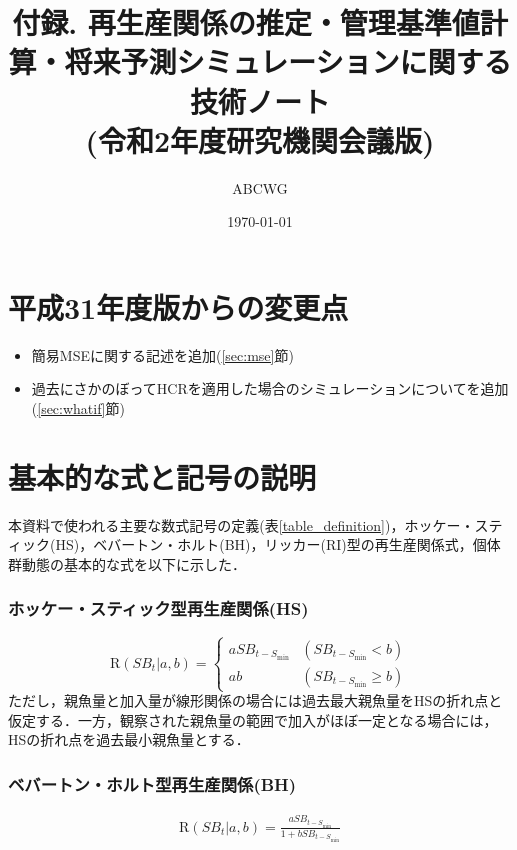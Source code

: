 \documentclass[11pt]{jsarticle}
\begin{document}
\title{付録. 再生産関係の推定・管理基準値計算・将来予測シミュレーションに関する技術ノート \\
  \Large (令和2年度研究機関会議版)
}
\author{ABCWG}
\date{\today}
\maketitle

\section{平成31年度版からの変更点}
\begin{itemize}
\item 簡易MSEに関する記述を追加(\ref{sec:mse}節)  
\item 過去にさかのぼってHCRを適用した場合のシミュレーションについてを追加(\ref{sec:whatif}節)
\end{itemize}

\section{基本的な式と記号の説明}
本資料で使われる主要な数式記号の定義(表\ref{table_definition})，ホッケー・スティック(HS)\cite{hockey}，ベバートン・ホルト(BH)\cite{beverton}，リッカー(RI)\cite{ricker}型の再生産関係式，個体群動態の基本的な式を以下に示した． 

\subsubsection*{ホッケー・スティック型再生産関係(HS)}
\begin{equation}
  \mathrm{R}(S\!B_{t}|a,b)=\begin{cases}
    a  S\!B_{t-S_{\mathrm{min}}} & (S\!B_{t-S_{\mathrm{min}}} < b) \\
    a  b                 & (S\!B_{t-S_{\mathrm{min}}} \geq b)
  \end{cases}
  \label{HS}
\end{equation}
ただし，親魚量と加入量が線形関係の場合には過去最大親魚量をHSの折れ点と仮定する．一方，観察された親魚量の範囲で加入がほぼ一定となる場合には，HSの折れ点を過去最小親魚量とする．

\subsubsection*{ベバートン・ホルト型再生産関係(BH)}
\begin{eqnarray}
  \mathrm{R}(S\!B_{t}|a,b)=\frac{a S\!B_{t-S_{\mathrm{min}}}}{1 + b S\!B_{t-S_{\mathrm{min}}}}
  \label{BH1}
\end{eqnarray}
\end{document}
